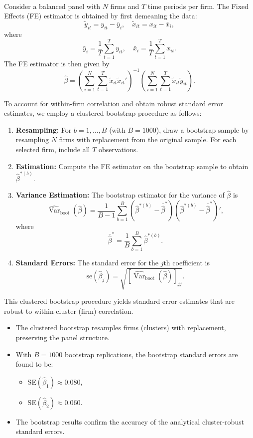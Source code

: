 \documentclass[a4paper,12pt]{article} %
\theoremstyle{nonitalic}
\newenvironment{solution}[1]
  {\renewcommand\theinnercustomsol{#1}\innercustomsol}
  {\endinnercustomsol}
\newcounter{solutionctr}
\renewcommand{\thesolutionctr}{(\alph{solutionctr})}
\newenvironment{autosolution}
  {\stepcounter{solutionctr}\begin{solution}{\thesolutionctr}}
  {\end{solution}}
\begin{document}
\begin{autosolution}
\

Consider a balanced panel with \(N\) firms and \(T\) time periods per firm. The Fixed Effects (FE) estimator is obtained by first demeaning the data:
\[
\tilde{y}_{it} = y_{it} - \bar{y}_i,\quad \tilde{x}_{it} = x_{it} - \bar{x}_i,
\]
where
\[
\bar{y}_i = \frac{1}{T}\sum_{t=1}^{T}y_{it}, \quad \bar{x}_i = \frac{1}{T}\sum_{t=1}^{T}x_{it}.
\]
The FE estimator is then given by
\[
\hat{\beta} = \left(\sum_{i=1}^{N}\sum_{t=1}^{T}\tilde{x}_{it}\tilde{x}_{it}'\right)^{-1}\left(\sum_{i=1}^{N}\sum_{t=1}^{T}\tilde{x}_{it}\tilde{y}_{it}\right).
\]

To account for within-firm correlation and obtain robust standard error estimates, we employ a clustered bootstrap procedure as follows:

\begin{enumerate}
    \item \textbf{Resampling:} For \(b=1,\dots,B\) (with \(B=1000\)), draw a bootstrap sample by resampling \(N\) firms with replacement from the original sample. For each selected firm, include all \(T\) observations.
    
    \item \textbf{Estimation:} Compute the FE estimator on the bootstrap sample to obtain \(\hat{\beta}^{*(b)}\).
    
    \item \textbf{Variance Estimation:} The bootstrap estimator for the variance of \(\hat{\beta}\) is
    \[
    \widehat{\operatorname{Var}}_{\text{boot}}(\hat{\beta}) = \frac{1}{B-1}\sum_{b=1}^{B}\left(\hat{\beta}^{*(b)} - \bar{\hat{\beta}}^{*}\right)\left(\hat{\beta}^{*(b)} - \bar{\hat{\beta}}^{*}\right)',
    \]
    where
    \[
    \bar{\hat{\beta}}^{*} = \frac{1}{B}\sum_{b=1}^{B}\hat{\beta}^{*(b)}.
    \]
    
    \item \textbf{Standard Errors:} The standard error for the \(j\)th coefficient is
    \[
    \text{se}(\hat{\beta}_{j}) = \sqrt{\left[\widehat{\operatorname{Var}}_{\text{boot}}(\hat{\beta})\right]_{jj}}.
    \]
\end{enumerate}

This clustered bootstrap procedure yields standard error estimates that are robust to within-cluster (firm) correlation.

\begin{itemize}
    
    \item The clustered bootstrap resamples firms (clusters) with replacement, preserving the panel structure.
    \item With \(B = 1000\) bootstrap replications, the bootstrap standard errors are found to be:
    \begin{itemize}
        \item SE\((\hat{\beta}_1) \approx 0.080\),
        \item SE\((\hat{\beta}_2) \approx 0.060\).
    \end{itemize}
    \item The bootstrap results confirm the accuracy of the analytical cluster-robust standard errors.
\end{itemize}


\end{autosolution}
\end{document}
